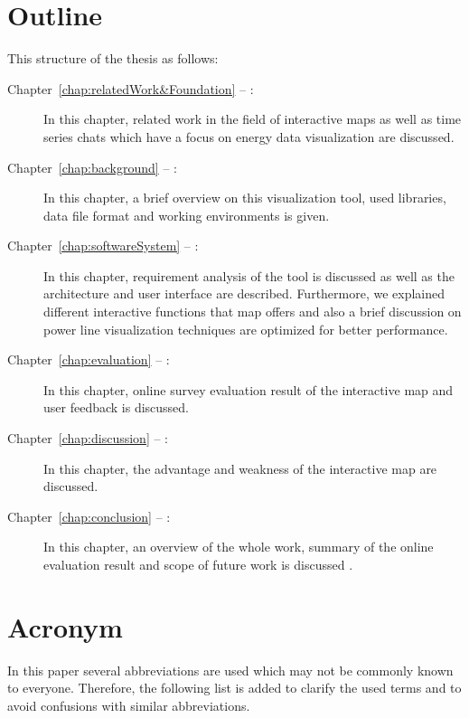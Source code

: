 \section*{Outline}
This structure of the thesis as follows:
\begin{description}

\item[Chapter~\ref{chap:relatedWork&Foundation} -- :]
In this chapter, related work in the field of interactive maps as well as time series chats which have a focus on energy data visualization are discussed. 

\item[Chapter~\ref{chap:background} -- :]
In this chapter, a brief overview on this visualization tool, used libraries, data file format and working environments is given.

\item[Chapter~\ref{chap:softwareSystem} -- :] In this chapter, requirement analysis of the tool is discussed as well as the architecture and user interface are described. Furthermore, we explained different interactive functions that map offers and also a brief discussion on power line visualization techniques are optimized for better performance. 
 
\item[Chapter~\ref{chap:evaluation} -- :] In this chapter, online survey evaluation result of the interactive map and user feedback is discussed.   

\item[Chapter~\ref{chap:discussion} -- :] In this chapter, the advantage and weakness of the interactive map are discussed.

\item[Chapter~\ref{chap:conclusion} -- :] In this chapter, an overview of the whole work, summary of the online evaluation result and scope of future work is discussed .

\end{description}

\section*{Acronym}
In this paper several abbreviations are used which may not be commonly known to everyone. Therefore, the following list is added to clarify the used terms and to avoid confusions with similar abbreviations. 

